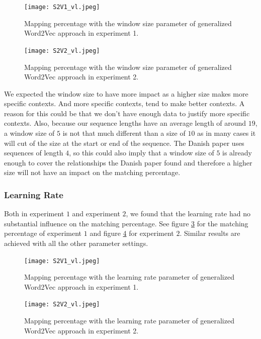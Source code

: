 \begin{figure}[!htb]
	\centering
	\texttt{[image: S2V1\_vl.jpeg]}
	\caption{Mapping percentage with the window size parameter of generalized Word2Vec approach in experiment 1.}
	\label{fig:s2v_vl_1}
\end{figure}

\begin{figure}[!htb]
	\centering
	\texttt{[image: S2V2\_vl.jpeg]}
	\caption{Mapping percentage with the window size parameter of generalized Word2Vec approach in experiment 2.}
	\label{fig:s2v_vl_2}
\end{figure}

We expected the window size to have more impact as a higher size makes more specific contexts. And more specific contexts, tend to make better contexts. A reason for this could be that we don't have enough data to justify more specific contexts. Also, because our sequence lengths have an average length of around $19$, a window size of $5$ is not that much different than a size of $10$ as in many cases it will cut of the size at the start or end of the sequence. The Danish paper uses sequences of length $4$, so this could also imply that a window size of $5$ is already enough to cover the relationships the Danish paper found and therefore a higher size will not have an impact on the matching percentage. 

\subsubsection*{Learning Rate}

Both in experiment $1$ and experiment $2$, we found that the learning rate had no substantial influence on the matching percentage. See figure \ref{fig:s2v_vl_1} for the matching percentage of experiment $1$ and figure \ref{fig:s2v_vl_2} for experiment $2$. Similar results are achieved with all the other parameter settings. \\

\begin{figure}[!htb]
	\centering
	\texttt{[image: S2V1\_vl.jpeg]}
	\caption{Mapping percentage with the learning rate parameter of generalized Word2Vec approach in experiment 1.}
	\label{fig:s2v_vl_1}
\end{figure}

\begin{figure}[!htb]
	\centering
	\texttt{[image: S2V2\_vl.jpeg]}
	\caption{Mapping percentage with the learning rate parameter of generalized Word2Vec approach in experiment 2.}
	\label{fig:s2v_vl_2}
\end{figure}

